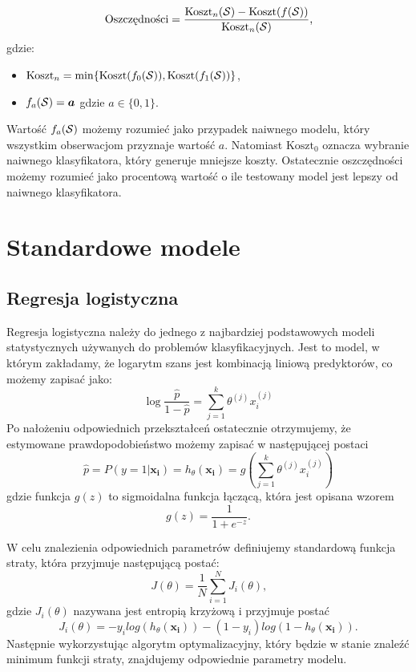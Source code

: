 \documentclass[inzynierska]{pwr_wmat_praca_dyplomowa}
\theoremstyle{plain}
\numberwithin{theorem}{chapter}
\theoremstyle{definition}
\numberwithin{theorem}{chapter}
\begin{document}
\begin{equation}
\text{Oszczędności} = \frac{\text{Koszt}_{n}(\mathcal{S}) - \text{Koszt}(f(\mathcal{S}))}{\text{Koszt}_{n}(\mathcal{S})} \text{,}
\end{equation}
gdzie:
\begin{itemize}
	\item $ \text{Koszt}_n = \min\{\text{Koszt}(f_{0}(\mathcal{S})), \text{Koszt}(f_{1}(\mathcal{S}))\} $,
	\item $ f_{a}(\mathcal{S}) = \boldsymbol{a} $ gdzie $a \in \{0,1\}$.
\end{itemize}{}
Wartość $ f_{a}(\mathcal{S})$ możemy rozumieć jako przypadek naiwnego modelu, który wszystkim obserwacjom przyznaje wartość $a$. Natomiast $ \text{Koszt}_0 $ oznacza wybranie naiwnego klasyfikatora, który generuje mniejsze koszty. Ostatecznie oszczędności możemy rozumieć jako procentową wartość o ile testowany model jest lepszy od naiwnego klasyfikatora.


\section{Standardowe modele}

\subsection{Regresja logistyczna}
\label{reg-log}
Regresja logistyczna należy do jednego z najbardziej podstawowych modeli statystycznych używanych do problemów klasyfikacyjnych. Jest to model, w którym zakładamy, że logarytm szans jest kombinacją liniową predyktorów, co możemy zapisać jako:
$$ \log{\frac{\hat{p}}{1 - \hat{p}}} = \sum_{j=1}^k \theta^{(j)}x_i^{(j)} $$
Po nałożeniu odpowiednich przekształceń ostatecznie otrzymujemy, że estymowane prawdopodobieństwo możemy zapisać w następującej postaci
\begin{equation}
	\hat{p} = P(y=1|\boldsymbol{x_i}) = h_{\theta}(\boldsymbol{x_i}) = g\left(\sum_{j=1}^k \theta^{(j)}x_i^{(j)} \right)
\end{equation} 
gdzie funkcja $g(z)$ to sigmoidalna funkcja łączącą, która jest opisana wzorem
$$ g(z) = \frac{1}{1+e^{-z}} \text{.}$$

W celu znalezienia odpowiednich parametrów definiujemy standardową funkcja straty, która przyjmuje następującą postać:
$$ J(\theta) = \frac{1}{N} \sum_{i=1}^N J_i(\theta) \text{,}$$
gdzie $J_i(\theta)$ nazywana jest entropią krzyżową i przyjmuje postać
\begin{equation}
	\label{c-e}
	J_i(\theta) = -y_i log(h_{\theta}(\boldsymbol{x_i})) - (1-y_i) log(1 - h_{\theta}(\boldsymbol{x_i})) \text{.}
\end{equation}
Następnie wykorzystując algorytm optymalizacyjny, który będzie w stanie znaleźć minimum funkcji straty, znajdujemy odpowiednie parametry modelu.
\end{document}
